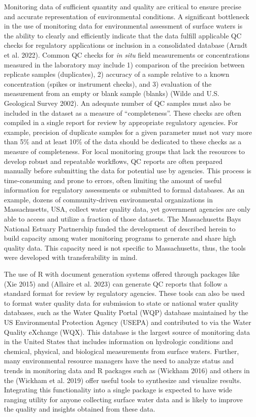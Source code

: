 Monitoring data of sufficient quantity and quality are critical to ensure precise and accurate representation of environmental conditions. A significant bottleneck in the use of monitoring data for environmental assessment of surface waters is the ability to clearly and efficiently indicate that the data fulfill applicable QC checks for regulatory applications or inclusion in a consolidated database (Arndt et al. 2022). Common QC checks for \emph{in situ} field measurements or concentrations measured in the laboratory may include 1) comparison of the precision between replicate samples (duplicates), 2) accuracy of a sample relative to a known concentration (spikes or instrument checks), and 3) evaluation of the measurement from an empty or blank sample (blanks) (Wilde and U.S. Geological Survey 2002). An adequate number of QC samples must also be included in the dataset as a measure of ``completeness''. These checks are often compiled in a single report for review by appropriate regulatory agencies. For example, precision of duplicate samples for a given parameter must not vary more than 5\% and at least 10\% of the data should be dedicated to these checks as a measure of completeness. For local monitoring groups that lack the resources to develop robust and repeatable workflows, QC reports are often prepared manually before submitting the data for potential use by agencies. This process is time-consuming and prone to errors, often limiting the amount of useful information for regulatory assessments or submitted to formal databases. As an example, dozens of community-driven environmental organizations in Massachusetts, USA, collect water quality data, yet government agencies are only able to access and utilize a fraction of those datasets. The Massachusetts Bays National Estuary Partnership funded the development of  described herein to build capacity among water monitoring programs to generate and share high quality data. This capacity need is not specific to Massachusetts, thus, the tools were developed with transferability in mind.

The use of R with document generation systems offered through packages like  (Xie 2015) and  (Allaire et al. 2023) can generate QC reports that follow a standard format for review by regulatory agencies. These tools can also be used to format water quality data for submission to state or national water quality databases, such as the Water Quality Portal (WQP) database maintained by the US Environmental Protection Agency (USEPA) and contributed to via the Water Quality eXchange (WQX). This database is the largest source of monitoring data in the United States that includes information on hydrologic conditions and chemical, physical, and biological measurements from surface waters. Further, many environmental resource managers have the need to analyze status and trends in monitoring data and R packages such as  (Wickham 2016) and others in the  (Wickham et al. 2019) offer useful tools to synthesize and visualize results. Integrating this functionality into a single package is expected to have wide ranging utility for anyone collecting surface water data and is likely to improve the quality and insights obtained from these data.

